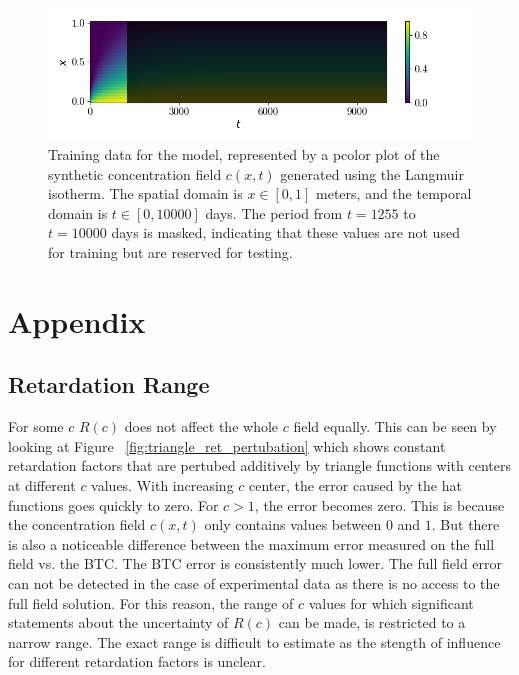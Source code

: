 \begin{figure}[h]
    \centering
    \includegraphics{figs/c_diss_field_full_black_test.png}
    \caption{Training data for the model, represented by a pcolor plot of the synthetic concentration field $c(x,t)$ generated using the Langmuir isotherm. The spatial domain is $x \in [0, 1]$ meters, and the temporal domain is $t \in [0, 10000]$ days. The period from $t = 1255$ to $t = 10000$ days is masked, indicating that these values are not used for training but are reserved for testing.}
    \label{fig:c_diss_field_full_black_test}
\end{figure}




\section*{Appendix}


\subsection{Retardation Range} %
For some $c$ $R(c)$ does not affect the whole $c$ field equally. This can be seen by looking at Figure ~\vref{fig:triangle_ret_pertubation} which shows constant retardation factors that are pertubed additively by triangle functions with centers at different $c$ values. With increasing $c$ center, the error caused by the hat functions goes quickly to zero. For $c > 1$, the error becomes zero. This is because the concentration field $c(x,t)$ only contains values between $0$ and $1$. But there is also a noticeable difference between the maximum error measured on the full field vs. the BTC. The BTC error is consistently much lower.
The full field error can not be detected in the case of experimental data as there is no access to the full field solution. For this reason, the range of $c$ values for which significant statements about the uncertainty of $R(c)$ can be made, is restricted to a narrow range. The exact range is difficult to estimate as the stength of influence for different retardation factors is unclear.


